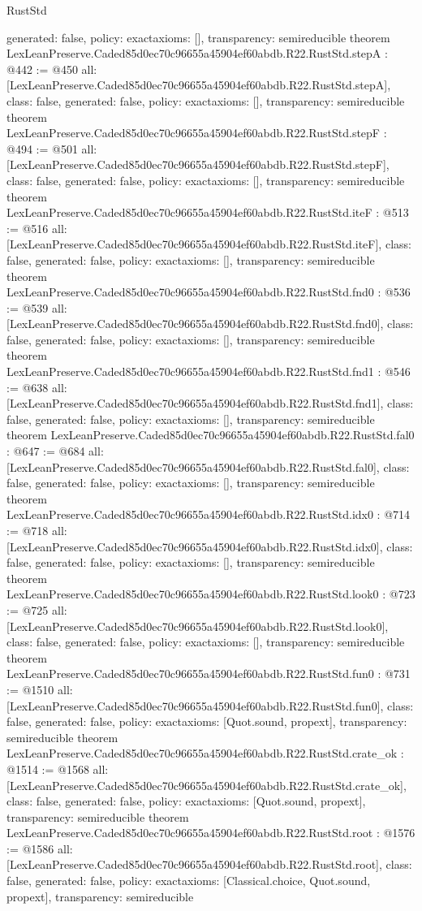 \begin{lexlean}{RustStd}
\begin{coremodule}
{  generated: false,
  policy: exact{axioms: []},
  transparency: semireducible
}
theorem LexLeanPreserve.Caded85d0ec70c96655a45904ef60abdb.R22.RustStd.stepA : @442 := @450 {
  all: [LexLeanPreserve.Caded85d0ec70c96655a45904ef60abdb.R22.RustStd.stepA],
  class: false,
  generated: false,
  policy: exact{axioms: []},
  transparency: semireducible
}
theorem LexLeanPreserve.Caded85d0ec70c96655a45904ef60abdb.R22.RustStd.stepF : @494 := @501 {
  all: [LexLeanPreserve.Caded85d0ec70c96655a45904ef60abdb.R22.RustStd.stepF],
  class: false,
  generated: false,
  policy: exact{axioms: []},
  transparency: semireducible
}
theorem LexLeanPreserve.Caded85d0ec70c96655a45904ef60abdb.R22.RustStd.iteF : @513 := @516 {
  all: [LexLeanPreserve.Caded85d0ec70c96655a45904ef60abdb.R22.RustStd.iteF],
  class: false,
  generated: false,
  policy: exact{axioms: []},
  transparency: semireducible
}
theorem LexLeanPreserve.Caded85d0ec70c96655a45904ef60abdb.R22.RustStd.fnd0 : @536 := @539 {
  all: [LexLeanPreserve.Caded85d0ec70c96655a45904ef60abdb.R22.RustStd.fnd0],
  class: false,
  generated: false,
  policy: exact{axioms: []},
  transparency: semireducible
}
theorem LexLeanPreserve.Caded85d0ec70c96655a45904ef60abdb.R22.RustStd.fnd1 : @546 := @638 {
  all: [LexLeanPreserve.Caded85d0ec70c96655a45904ef60abdb.R22.RustStd.fnd1],
  class: false,
  generated: false,
  policy: exact{axioms: []},
  transparency: semireducible
}
theorem LexLeanPreserve.Caded85d0ec70c96655a45904ef60abdb.R22.RustStd.fal0 : @647 := @684 {
  all: [LexLeanPreserve.Caded85d0ec70c96655a45904ef60abdb.R22.RustStd.fal0],
  class: false,
  generated: false,
  policy: exact{axioms: []},
  transparency: semireducible
}
theorem LexLeanPreserve.Caded85d0ec70c96655a45904ef60abdb.R22.RustStd.idx0 : @714 := @718 {
  all: [LexLeanPreserve.Caded85d0ec70c96655a45904ef60abdb.R22.RustStd.idx0],
  class: false,
  generated: false,
  policy: exact{axioms: []},
  transparency: semireducible
}
theorem LexLeanPreserve.Caded85d0ec70c96655a45904ef60abdb.R22.RustStd.look0 : @723 := @725 {
  all: [LexLeanPreserve.Caded85d0ec70c96655a45904ef60abdb.R22.RustStd.look0],
  class: false,
  generated: false,
  policy: exact{axioms: []},
  transparency: semireducible
}
theorem LexLeanPreserve.Caded85d0ec70c96655a45904ef60abdb.R22.RustStd.fun0 : @731 := @1510 {
  all: [LexLeanPreserve.Caded85d0ec70c96655a45904ef60abdb.R22.RustStd.fun0],
  class: false,
  generated: false,
  policy: exact{axioms: [Quot.sound, propext]},
  transparency: semireducible
}
theorem LexLeanPreserve.Caded85d0ec70c96655a45904ef60abdb.R22.RustStd.crate_ok : @1514 := @1568 {
  all: [LexLeanPreserve.Caded85d0ec70c96655a45904ef60abdb.R22.RustStd.crate_ok],
  class: false,
  generated: false,
  policy: exact{axioms: [Quot.sound, propext]},
  transparency: semireducible
}
theorem LexLeanPreserve.Caded85d0ec70c96655a45904ef60abdb.R22.RustStd.root : @1576 := @1586 {
  all: [LexLeanPreserve.Caded85d0ec70c96655a45904ef60abdb.R22.RustStd.root],
  class: false,
  generated: false,
  policy: exact{axioms: [Classical.choice, Quot.sound, propext]},
  transparency: semireducible
}


\end{coremodule}
\end{lexlean}

